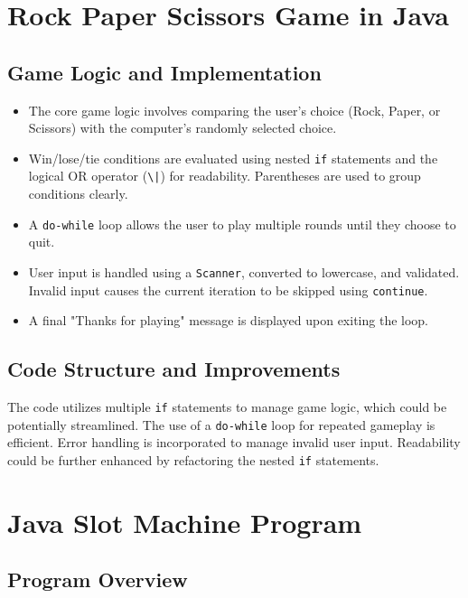 \documentclass{article}
\begin{document}
\section{Rock Paper Scissors Game in Java}

\subsection{Game Logic and Implementation}

\begin{itemize}
    \item The core game logic involves comparing the user's choice (Rock, Paper, or Scissors) with the computer's randomly selected choice.
    \item Win/lose/tie conditions are evaluated using nested \texttt{if} statements and the logical OR operator (\texttt{\textbackslash{}|}) for readability.  Parentheses are used to group conditions clearly.
    \item A \texttt{do-while} loop allows the user to play multiple rounds until they choose to quit.
    \item User input is handled using a \texttt{Scanner}, converted to lowercase, and validated.  Invalid input causes the current iteration to be skipped using \texttt{continue}.
    \item A final "Thanks for playing" message is displayed upon exiting the loop.
\end{itemize}


\subsection{Code Structure and Improvements}

The code utilizes multiple \texttt{if} statements to manage game logic, which could be potentially streamlined.  The use of a \texttt{do-while} loop for repeated gameplay is efficient.  Error handling is incorporated to manage invalid user input.  Readability could be further enhanced by refactoring the nested \texttt{if} statements.


\section{Java Slot Machine Program}

\subsection{Program Overview}
\end{document}
